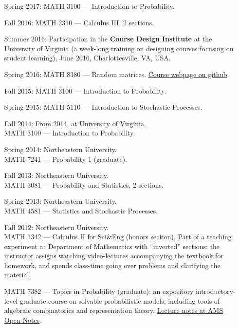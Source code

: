 \documentclass[letterpaper,11pt]{article}
\begin{document}
\begin{itemize}
\item[Spring 2017:]
	MATH 3100 --- Introduction to Probability.

\item[Fall 2016:]
	MATH 2310 --- Calculus III, 2 sections.

\item[Summer 2016:] Participation in the \textbf{Course Design Institute} at the University of Virginia (a week-long training on designing courses focusing on student learning), June 2016, Charlottesville, VA, USA.

\item[Spring 2016:]
	MATH 8380 --- Random matrices. \href{https://github.com/lenis2000/RMT_Spring_2016}{Course webpage on github}.

\item[Fall 2015:]
	MATH 3100 --- Introduction to Probability.

\item[Spring 2015:]
	MATH 5110 --- Introduction to Stochastic Processes.

	\item
	      [Fall 2014:]
	      From 2014, at University of Virginia. \\ MATH 3100 --- Introduction to
	      Probability.

	\item
	      [Spring 2014:]
	      Northeastern University. \\ MATH 7241 --- Probability 1
	      (graduate).

	\item
	      [Fall 2013:]
	      Northeastern University. \\ MATH 3081 --- Probability and
	      Statistics, 2 sections.
	\item
	      [Spring 2013:]
	      Northeastern University. \\ MATH 4581 --- Statistics and
	      Stochastic Processes.
	\item
	      [Fall 2012:]
	      Northeastern University. \\ MATH 1342 --- Calculus II for
	      Sci\&Eng (honors section). Part of a teaching experiment at Department of
	      Mathematics with ``inverted'' sections: the instructor assigns watching
	      video-lectures accompanying the textbook for homework, and spends class-time
	      going over problems and clarifying the material.

	      MATH 7382 --- Topics in Probability (graduate): an expository
	      introductory-level graduate course on solvable probabilistic models, including
	      tools of algebraic combinatorics and representation theory.
		  \href{https://www.ams.org/open-math-notes/omn-view-listing?listingId=110813}{Lecture notes at AMS Open Notes}.


\end{itemize}
\end{document}
